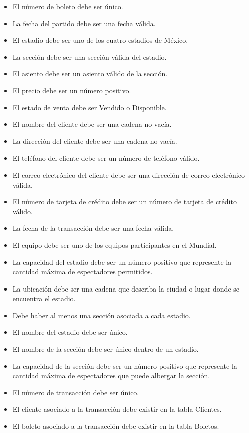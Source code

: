 \begin{itemize}
    \item El número de boleto debe ser único.
    \item La fecha del partido debe ser una fecha válida.
    \item El estadio debe ser uno de los cuatro estadios de México.
    \item La sección debe ser una sección válida del estadio.
    \item El asiento debe ser un asiento válido de la sección.
    \item El precio debe ser un número positivo.
    \item El estado de venta debe ser Vendido o Disponible.
    \item El nombre del cliente debe ser una cadena no vacía.
    \item La dirección del cliente debe ser una cadena no vacía.
    \item El teléfono del cliente debe ser un número de teléfono válido.
    \item El correo electrónico del cliente debe ser una dirección de correo electrónico válida.
    \item El número de tarjeta de crédito debe ser un número de tarjeta de crédito válido.
    \item La fecha de la transacción debe ser una fecha válida.
    \item El equipo debe ser uno de los equipos participantes en el Mundial.
    \item La capacidad del estadio debe ser un número positivo que represente la cantidad máxima de espectadores permitidos.
    \item La ubicación debe ser una cadena que describa la ciudad o lugar donde se encuentra el estadio.
    \item Debe haber al menos una sección asociada a cada estadio.
    \item El nombre del estadio debe ser único.
    \item El nombre de la sección debe ser único dentro de un estadio.
    \item La capacidad de la sección debe ser un número positivo que represente la cantidad máxima de espectadores que puede albergar la sección.
    \item El número de transacción debe ser único.
    \item El cliente asociado a la transacción debe existir en la tabla Clientes.
    \item El boleto asociado a la transacción debe existir en la tabla Boletos.

\end{itemize}
